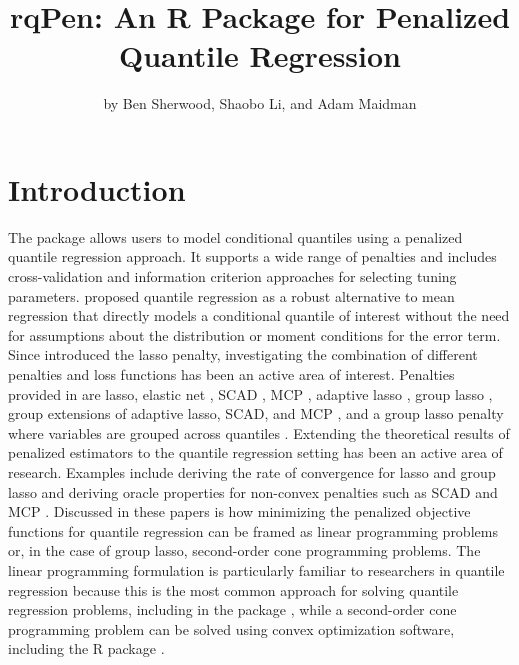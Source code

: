 \title{rqPen: An R Package for Penalized Quantile Regression}


\author{by Ben Sherwood, Shaobo Li, and Adam Maidman}

\maketitle


\section{Introduction}\label{introduction}

The package  allows users to model conditional quantiles using a penalized quantile regression approach. It supports a wide range of penalties and includes cross-validation and information criterion approaches for selecting tuning parameters. \citet{origQR} proposed quantile regression as a robust alternative to mean regression that
directly models a conditional quantile of interest without the need for assumptions about the
distribution or moment conditions for the error term. Since \citet{lasso} introduced the lasso penalty, investigating the combination of different penalties and loss functions has been an active area of interest. Penalties provided in  are lasso, elastic net \citep{zou05}, SCAD \citep{fanLi}, MCP \citep{mcp}, adaptive lasso \citep{adaptiveLasso}, group lasso \citep{yuan2007}, group extensions of adaptive lasso, SCAD, and MCP \citep{grSCAD, groupReview, penBiLevel}, and a group lasso penalty where variables are grouped across quantiles \citep{heteroIdQR}. Extending the theoretical results of penalized estimators to the quantile regression setting has been an active area of research. Examples include deriving the rate of convergence for lasso \citep{qr_lasso} and group lasso \citep{qr_group_lasso} and deriving oracle properties for non-convex penalties such as SCAD and MCP \citep{lan_scad}. Discussed in these papers is how minimizing the penalized objective functions for quantile regression can be framed as linear programming problems or, in the case of group lasso, second-order cone programming problems. The linear programming formulation is particularly familiar to researchers in quantile regression because this is the most common approach for solving quantile regression problems, including in the  package \citep{crq1, crq2}, while a second-order cone programming problem can be solved using convex optimization software, including the R package  \citep{JSSv060i05}.

